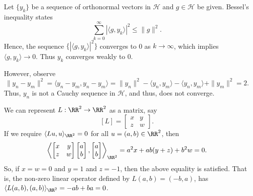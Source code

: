 \documentclass{homework}
\begin{document}
\begin{solution}
  Let $\{y_k\}$ be a sequence of orthonormal vectors in $\mathcal H$ and $g \in \mathcal H$ be given. Bessel's inequality states
  $$
    \sum_{k=0}^\infty |\langle g,y_k\rangle|^2 \le \|g\|^2.
  $$
  Hence, the sequence $\{|\langle g,y_k\rangle |^2\}$ converges to 0 as $k\to \infty$, which implies $\langle g, y_k\rangle \to 0$.  Thus $y_k$ converges weakly to $0$.

  However, observe
  $$
    \|y_n - y_m\|^2 = \langle y_n - y_m, y_n - y_m\rangle = \|y_n\|^2 - \langle y_n,y_m \rangle - \langle y_n,y_m \rangle + \|y_m\|^2 = 2.
  $$
  Thus, $y_n$ is not a Cauchy sequence in $\mathcal H$, and thus, does not converge.
\end{solution}


\begin{solution}
  We can represent $L:\RR^2 \to \RR^2$ as a matrix, say
  $$
    [L] = \begin{bmatrix}
      x & y \\
      z & w
    \end{bmatrix}.
  $$
  If we require $\langle Lu, u\rangle_{\RR^2} = 0$ for all $u = (a,b) \in \RR^2$, then
  $$
    \left\langle \begin{bmatrix}
      x & y \\
      z & w
    \end{bmatrix}
    \begin{bmatrix}
      a \\ b
    \end{bmatrix}
    , 
    \begin{bmatrix}
      a \\ b
    \end{bmatrix}
    \right\rangle_{\RR^2}
    = a^2 x + ab(y + z) + b^2 w = 0.
  $$
  So, if $x = w = 0$ and $y =1 $ and $z = -1$, then the above equality is satisfied. That is, the non-zero linear operator defined by $L(a,b) = (-b,a)$, has $\langle L(a,b), (a,b) \rangle_{\RR^2} = -ab + ba = 0$.
\end{solution}
\end{document}
